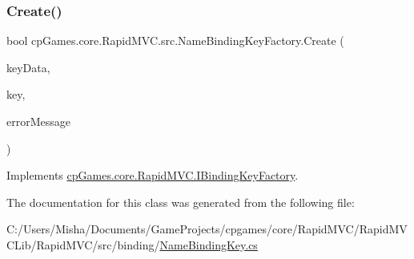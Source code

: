 \subsubsection{\texorpdfstring{Create()}{Create()}}
{\footnotesize\ttfamily bool cp\+Games.\+core.\+Rapid\+M\+V\+C.\+src.\+Name\+Binding\+Key\+Factory.\+Create (\begin{DoxyParamCaption}\item[{object}]{key\+Data,  }\item[{out \mbox{\hyperlink{interfacecp_games_1_1core_1_1_rapid_m_v_c_1_1_i_binding_key}{I\+Binding\+Key}}}]{key,  }\item[{out string}]{error\+Message }\end{DoxyParamCaption})}



Implements \mbox{\hyperlink{interfacecp_games_1_1core_1_1_rapid_m_v_c_1_1_i_binding_key_factory_acebadb5b1ee05c449b3872428ce554ff}{cp\+Games.\+core.\+Rapid\+M\+V\+C.\+I\+Binding\+Key\+Factory}}.



The documentation for this class was generated from the following file\+:\begin{DoxyCompactItemize}
\item 
C\+:/\+Users/\+Misha/\+Documents/\+Game\+Projects/cpgames/core/\+Rapid\+M\+V\+C/\+Rapid\+M\+V\+C\+Lib/\+Rapid\+M\+V\+C/src/binding/\mbox{\hyperlink{_name_binding_key_8cs}{Name\+Binding\+Key.\+cs}}\end{DoxyCompactItemize}
